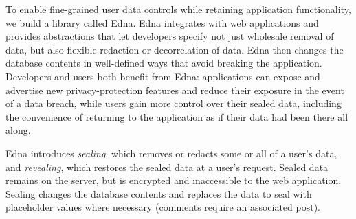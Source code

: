 \label{sec:intro:approach}
To enable fine-grained user data controls while retaining application
functionality, we build a library called Edna.  Edna integrates with web
applications and provides abstractions that let developers specify not just
wholesale removal of data, but also flexible redaction or decorrelation of data.
Edna then changes the database contents in well-defined ways that avoid breaking
the application.  Developers and users both benefit from Edna: applications can
expose and advertise new privacy-protection features and reduce their exposure
in the event of a data breach, while users gain more control over their sealed
data, including the convenience of returning to the application as if their data
had been there all along.

Edna introduces \emph{sealing}, which removes or redacts some or all of a user's
data, and \emph{revealing}, which restores the sealed data at a user's request.
Sealed data remains on the server, but is encrypted and inaccessible to the web
application. Sealing changes the database contents and replaces the data to seal
with placeholder values where necessary (\eg comments require an associated
post). 

